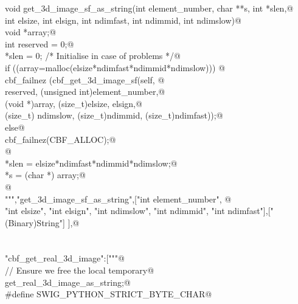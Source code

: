 \documentclass[10pt,a4paper,twoside,notitlepage]{article}
\begin{document}
\begin{flushleft}
\begin{minipage}{\linewidth}
\begin{list}{}{}
\mbox{}\verb@    void get_3d_image_sf_as_string(int element_number, char **s, int *slen,@\\
\mbox{}\verb@    int elsize, int elsign, int ndimfast, int ndimmid, int ndimslow){@\\
\mbox{}\verb@        void *array;@\\
\mbox{}\verb@        int reserved = 0;@\\
\mbox{}\verb@        *slen = 0; /* Initialise in case of problems */@\\
\mbox{}\verb@        if ((array=malloc(elsize*ndimfast*ndimmid*ndimslow))) {@\\
\mbox{}\verb@               cbf_failnez (cbf_get_3d_image_sf(self, @\\
\mbox{}\verb@               reserved, (unsigned int)element_number,@\\
\mbox{}\verb@               (void *)array, (size_t)elsize, elsign,@\\
\mbox{}\verb@               (size_t) ndimslow, (size_t)ndimmid, (size_t)ndimfast));@\\
\mbox{}\verb@         }else{@\\
\mbox{}\verb@               cbf_failnez(CBF_ALLOC);@\\
\mbox{}\verb@         }@\\
\mbox{}\verb@        *slen = elsize*ndimfast*ndimmid*ndimslow;@\\
\mbox{}\verb@        *s = (char *) array;@\\
\mbox{}\verb@      }@\\
\mbox{}\verb@""","get_3d_image_sf_as_string",["int element_number", @\\
\mbox{}\verb@    "int elsize", "int elsign", "int ndimslow", "int ndimmid", "int ndimfast"],["(Binary)String"] ],@\\
\mbox{}\verb@@\\
\mbox{}\verb@@\\
\mbox{}\verb@"cbf_get_real_3d_image":["""@\\
\mbox{}\verb@// Ensure we free the local temporary@\\
\mbox{}\verb@%cstring_output_allocate_size(char ** s, int *slen, free(*$1))@\\
\mbox{}\verb@       get_real_3d_image_as_string;@\\
\mbox{}\verb@%{@\\
\mbox{}\verb@#define SWIG_PYTHON_STRICT_BYTE_CHAR@\\
\mbox{}\verb@%}@\\
\mbox{}\verb@@\\

\end{list}
\end{minipage}
\end{flushleft}
\end{document}
